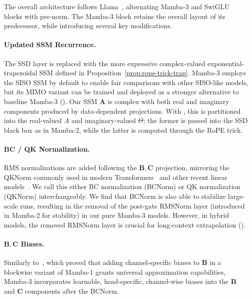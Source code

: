 \documentclass{article}
\newcommand{\citep}{\parencite}
\newcommand{\citet}{\textcite}
\def\bA{{\bm{A}}}
\def\bB{{\bm{B}}}
\def\bC{{\bm{C}}}
\theoremstyle{plain}
\theoremstyle{definition}
\theoremstyle{remark}
\begin{document}
The overall architecture follows Llama~\citep{grattafiori2024llama3herdmodels}, alternating Mamba-3 and SwiGLU blocks with pre-norm. 
The Mamba-3 block retains the overall layout of its predecessor, while introducing several key modifications.

\paragraph{Updated SSM Recurrence.}
The SSD layer is replaced with the more expressive complex-valued exponential-trapezoidal SSM defined in Proposition~\ref{prop:rope-trick-trap}.
Mamba-3 employs the SISO SSM by default to enable fair comparisons with other SISO-like models, but its MIMO variant can be trained and deployed as a stronger alternative to baseline Mamba-3 ().
Our SSM $\bA$ is complex with both real and imaginary components produced by data-dependent projections. With , this is partitioned into the real-valued $A$ and imaginary-valued $\Theta$; the former is passed into the SSD black box as in Mamba-2, while the latter is computed through the RoPE trick.

\paragraph{BC / QK Normalization.}
RMS normalizations are added following the $\bB,\bC$ projection, mirroring the QKNorm commonly used in modern Transformers~\citep{henry2020querykeynormalizationtransformers,wortsman2023smallscaleproxieslargescaletransformer} and other recent linear models~\citep{yang2025gateddeltanetworksimproving, hu2025combaimprovingbilinearrnns}.
We call this either BC normalization (BCNorm) or QK normalization (QKNorm) interchangeably.
We find that BCNorm is also able to stabilize large-scale runs, resulting in the removal of the post-gate RMSNorm layer (introduced in Mamba-2 for stability) in our pure Mamba-3 models.
However, in hybrid models, the removed RMSNorm layer is crucial for long-context extrapolation ().

\paragraph{$\bB, \bC$ Biases.}
Similarly to~\citet{yu2025blockbiasedmamba}, which proved that adding channel-specific biases to $\bB$ in a blockwise variant of Mamba-1 grants universal approximation capabilities, Mamba-3 incorporates learnable, head-specific, channel-wise biases into the $\bB$ and $\bC$ components after the BCNorm.
\end{document}
